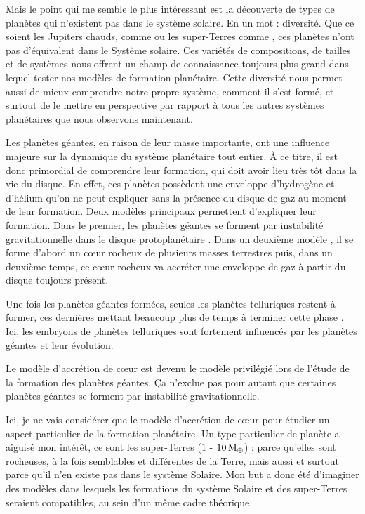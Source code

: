 Mais le point qui me semble le plus intéressant est la découverte de types de planètes qui n'existent pas dans le système
solaire. En un mot : diversité. Que ce soient les Jupiters chauds, comme  ou les super-Terres comme
, ces planètes n'ont pas d'équivalent dans le Système solaire. Ces variétés de compositions, de tailles et de
systèmes nous offrent un champ de connaissance toujours plus grand dans lequel tester nos modèles de formation planétaire.
Cette diversité nous permet aussi de mieux comprendre notre propre système, comment il s'est formé, et surtout de le mettre
en perspective par rapport à tous les autres systèmes planétaires que nous observons maintenant.

Les planètes géantes, en raison de leur masse importante, ont une influence majeure sur la dynamique du système planétaire tout entier. À ce titre, il est donc primordial de comprendre leur formation, qui doit avoir lieu très tôt dans la vie du disque. En effet, ces planètes possèdent une enveloppe d'hydrogène et d'hélium qu'on ne peut expliquer sans la présence du disque de gaz au moment de leur formation. Deux modèles principaux permettent d'expliquer leur formation. Dans le premier, les planètes géantes se forment par instabilité gravitationnelle dans le disque protoplanétaire \citep{boss1997giant}. Dans un deuxième modèle \citep{pollack1996formation, alibert2004migration, levison2010modeling}, il se forme d'abord un cœur rocheux de plusieurs masses terrestres puis, dans un deuxième temps, ce cœur rocheux va accréter une enveloppe de gaz à partir du disque toujours présent. 

Une fois les planètes géantes formées, seules les planètes telluriques restent à former, ces dernières mettant beaucoup plus de temps à terminer cette phase \citep{morbidelli2012building}. Ici, les embryons de planètes telluriques sont fortement influencés par les planètes géantes et leur évolution. 

Le modèle d'accrétion de cœur est devenu le modèle privilégié lors de l'étude de la formation des planètes géantes. Ça n'exclue pas pour autant que certaines planètes géantes se forment par instabilité gravitationnelle. 

Ici, je ne vais considérer que le modèle d'accrétion de cœur pour étudier un aspect particulier de la formation planétaire. Un type particulier de planète a aiguisé mon intérêt, ce sont les super-Terres ($1$ - $10\mathrm{\thinspace M_\oplus}$) : parce
qu'elles sont rocheuses, à la fois semblables et différentes de la Terre, mais aussi et surtout parce qu'il n'en existe pas dans
le système Solaire. Mon but a donc été d'imaginer des modèles dans lesquels les formations du système Solaire et des
super-Terres seraient compatibles, au sein d'un même cadre théorique.

